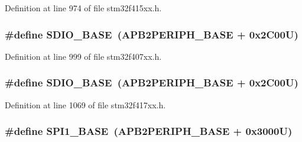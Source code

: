 Definition at line 974 of file stm32f415xx.\+h.

\subsubsection[{\texorpdfstring{S\+D\+I\+O\+\_\+\+B\+A\+SE}{SDIO_BASE}}]{\setlength{\rightskip}{0pt plus 5cm}\#define S\+D\+I\+O\+\_\+\+B\+A\+SE~({\bf A\+P\+B2\+P\+E\+R\+I\+P\+H\+\_\+\+B\+A\+SE} + 0x2\+C00\+U)}\hypertarget{group___peripheral__registers__structures_ga95dd0abbc6767893b4b02935fa846f52}{}\label{group___peripheral__registers__structures_ga95dd0abbc6767893b4b02935fa846f52}


Definition at line 999 of file stm32f407xx.\+h.

\subsubsection[{\texorpdfstring{S\+D\+I\+O\+\_\+\+B\+A\+SE}{SDIO_BASE}}]{\setlength{\rightskip}{0pt plus 5cm}\#define S\+D\+I\+O\+\_\+\+B\+A\+SE~({\bf A\+P\+B2\+P\+E\+R\+I\+P\+H\+\_\+\+B\+A\+SE} + 0x2\+C00\+U)}\hypertarget{group___peripheral__registers__structures_ga95dd0abbc6767893b4b02935fa846f52}{}\label{group___peripheral__registers__structures_ga95dd0abbc6767893b4b02935fa846f52}


Definition at line 1069 of file stm32f417xx.\+h.

\subsubsection[{\texorpdfstring{S\+P\+I1\+\_\+\+B\+A\+SE}{SPI1_BASE}}]{\setlength{\rightskip}{0pt plus 5cm}\#define S\+P\+I1\+\_\+\+B\+A\+SE~({\bf A\+P\+B2\+P\+E\+R\+I\+P\+H\+\_\+\+B\+A\+SE} + 0x3000\+U)}\hypertarget{group___peripheral__registers__structures_ga50cd8b47929f18b05efbd0f41253bf8d}{}\label{group___peripheral__registers__structures_ga50cd8b47929f18b05efbd0f41253bf8d}


